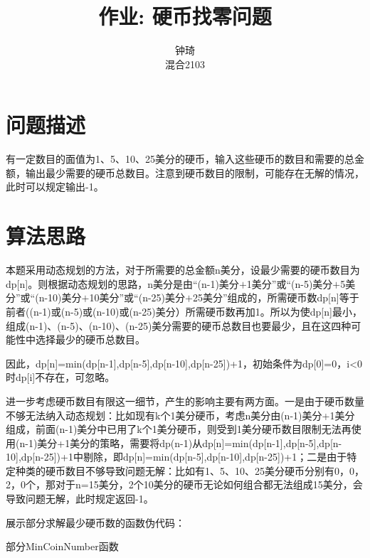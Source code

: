 \documentclass[UTF8]{ctexart}
\title{作业: 硬币找零问题}
\author{钟琦 \\ 混合2103\quad3210103612}
\begin{document}
\maketitle
\section{问题描述}
有一定数目的面值为1、5、10、25美分的硬币，输入这些硬币的数目和需要的总金额，输出最少需要的硬币总数目。注意到硬币数目的限制，可能存在无解的情况，此时可以规定输出-1。
\section{算法思路}
本题采用动态规划的方法，对于所需要的总金额n美分，设最少需要的硬币数目为dp[n]。则根据动态规划的思路，n美分是由“(n-1)美分$+$1美分”或“(n-5)美分$+$5美分”或“(n-10)美分$+$10美分”或“(n-25)美分$+$25美分”组成的，所需硬币数dp[n]等于前者((n-1)或(n-5)或(n-10)或(n-25)美分）所需硬币数再加1。所以为使dp[n]最小，组成(n-1)、(n-5)、(n-10)、(n-25)美分需要的硬币总数目也要最少，且在这四种可能性中选择最少的硬币总数目。\par
因此，dp[n]=min(dp[n-1],dp[n-5],dp[n-10],dp[n-25])+1，初始条件为dp[0]=0，i<0时dp[i]不存在，可忽略。\par
进一步考虑硬币数目有限这一细节，产生的影响主要有两方面。一是由于硬币数量不够无法纳入动态规划：比如现有k个1美分硬币，考虑n美分由(n-1)美分+1美分组成，前面(n-1)美分中已用了k个1美分硬币，则受到1美分硬币数目限制无法再使用(n-1)美分+1美分的策略，需要将dp(n-1)从dp[n]=min(dp[n-1],dp[n-5],dp[n-10],dp[n-25])+1中剔除，即dp[n]=min(dp[n-5],dp[n-10],dp[n-25])+1；二是由于特定种类的硬币数目不够导致问题无解：比如有1、5、10、25美分硬币分别有0，0，2，0个，那对于n=15美分，2个10美分的硬币无论如何组合都无法组成15美分，会导致问题无解，此时规定返回-1。\par
展示部分求解最少硬币数的函数伪代码：\par
\begin{algorithm}[H]
    \SetAlgoLined  
    \caption{部分MinCoinNumber函数}  
\end{algorithm}
\end{document}
